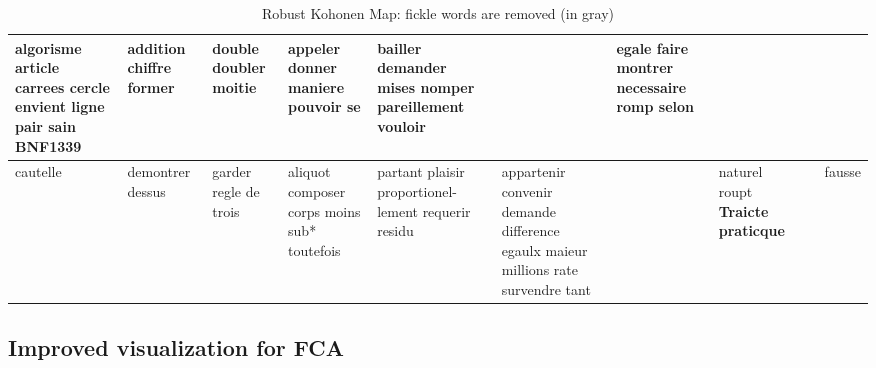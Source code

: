 \documentclass[preprint]{elsarticle}
\begin{document}
\begin{table}[ht!]
{\begin{tabular}{|p{1.9cm}|p{1.9cm}|p{1.9cm}|p{1.9cm}|p{1.9cm}|p{1.9cm}|p{1.9cm}|p{1.9cm}|p{1.9cm}|p{1.9cm}|}
\hline
algorisme article carrees cercle envient ligne pair sain \cellcolor{grisclair} \textbf{BNF1339} & addition chiffre former &  \textcolor{gris}{double}  \textcolor{gris}{doubler} moitie & appeler  \textcolor{gris}{donner}  \textcolor{gris}{maniere}  \textcolor{gris}{pouvoir}  \textcolor{gris}{se}& bailler demander mises nomper pareillement vouloir & & egale faire montrer necessaire romp selon & & & \\
\hline
cautelle & demontrer dessus &  \textcolor{gris}{garder}  \textcolor{gris}{regle}  \textcolor{gris}{de}  \textcolor{gris}{trois} & aliquot composer corps moins sub* toutefois & partant plaisir proportionel- lement requerir residu & appartenir convenir demande difference egaulx maieur millions rate survendre tant & & naturel roupt \cellcolor{grisclair} \textbf{Traicte praticque} & & fausse\\
\hline
\end{tabular}
}
\label{tab:koho3}
\caption{Robust Kohonen Map: fickle words are removed (in gray)}
\end{table}

\subsection{Improved visualization for FCA}
\end{document}
